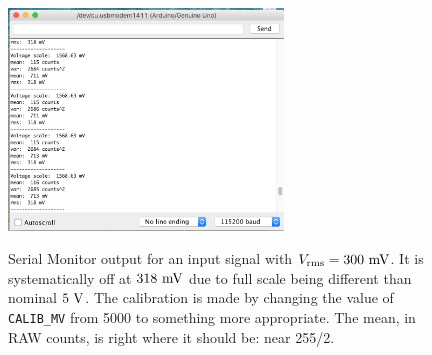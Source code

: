 \documentclass[12pt]{article}
\begin{document}
\begin{figure}[htbp]
\begin{center}
{\includegraphics[width=0.65\textwidth]{figs/uncalibrated.png}}
\end{center}
\caption{\label{fig:uncalib} Serial Monitor output for an input signal with $V_{\rm rms} = 300~\rm mV$.   It is systematically off at $318~\rm mV$ due to full scale being different than nominal $5~\rm V$.  The calibration is made by changing the value of {\tt CALIB\_MV} from 5000 to something more appropriate.
The mean, in RAW counts, is right where it should be:  near 255/2.
}\end{figure}
\end{document}
